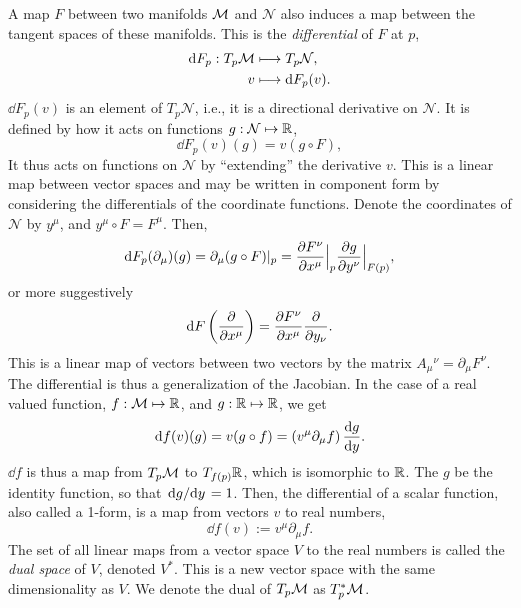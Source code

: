 A map $F$ between two manifolds $\mathcal{M}$ and $\mathcal N$ also induces a map between the tangent spaces of these manifolds.
This is the \emph{differential} of $F$ at $p$, 
%
\begin{align}
    \text{d} F_p: T_p \mathcal{M} & \longmapsto T_p \mathcal N, \\
    v & \longmapsto \text{d} F_p (v). 
\end{align}
%
$\dd F_p(v)$ is an element of $T_p \mathcal N$, i.e., it is a directional derivative on $\mathcal N$.
It is defined by how it acts on functions $g: \mathcal N \mapsto \mathbb{R}$,
%
\begin{equation}
    \dd F_p(v) (g) = v(g \circ F),
\end{equation}
%
It thus acts on functions on $\mathcal N$ by ``extending'' the derivative $v$.
This is a linear map between vector spaces and may be written in component form by considering the differentials of the coordinate functions.
Denote the coordinates of $\mathcal N$ by $y^\mu$, and $y^\mu \circ F = F^\mu$.
Then,
%
\begin{equation}
    \text{d} F_p (\partial_\mu) (g) = \partial_\mu (g \circ F) |_p 
    = \pdv{F^\nu}{x^\mu}\Big |_p \pdv{g}{y^\nu} \Big  |_{F(p)},
\end{equation}
%
or more suggestively
%
\begin{equation}
    \text{d} F \left( \pdv{}{x^\mu} \right) = \pdv{F^\nu}{x^\mu} \pdv{}{y_\nu}.
\end{equation}
%
This is a linear map of vectors between two vectors by the matrix $A_\mu{}^\nu = \partial_\mu F^\nu$.
The differential is thus a generalization of the Jacobian.
In the case of a real valued function, $f: \mathcal{M} \mapsto \mathbb{R}$, and $g : \mathbb{R} \mapsto \mathbb{R}$, we get
%
\begin{equation}
    \dd f (v) (g) 
    = v(g \circ f) 
    = (v^\mu \partial_\mu f) \, \odv{g}{y}.
\end{equation}
%
$\dd f$ is thus a map from $T_p \mathcal{M}$ to $T_{f(p)}\mathbb{R}$, which is isomorphic to $\mathbb{R}$.
The $g$ be the identity function, so that $\odv{g}/{y} = 1$.
Then, the differential of a scalar function, also called a 1-form, is a map from vectors $v$ to real numbers,
%
\begin{equation}
    \label{covectors i.e. one forms}
    \dd f(v) := v^\mu \partial_\mu f.
\end{equation}
%
The set of all linear maps from a vector space $V$ to the real numbers is called the \emph{dual space} of $V$, denoted $V^*$.
This is a new vector space with the same dimensionality as $V$.
We denote the dual of $T_p \mathcal{M}$ as $T_p^* \mathcal{M}$.
